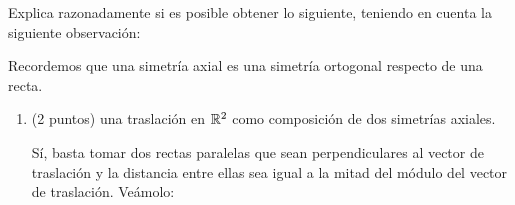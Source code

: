 \documentclass[12pt]{article}
\begin{document}
    \begin{ejercicio}[4 puntos]
        Explica razonadamente si es posible obtener lo siguiente, teniendo en cuenta
        la siguiente observación:
        \begin{observacion}
            Recordemos que una simetría axial es una simetría ortogonal respecto de una recta.
        \end{observacion}
        

        \begin{enumerate}
            \item (2 puntos) una traslación en $\mathbb{R}^2$ como composición de dos simetrías axiales.

            Sí, basta tomar dos rectas paralelas que sean perpendiculares al vector de traslación y la distancia entre ellas sea igual a la mitad del módulo del vector de traslación.
            Veámolo:


\end{enumerate}
\end{ejercicio}
\end{document}
